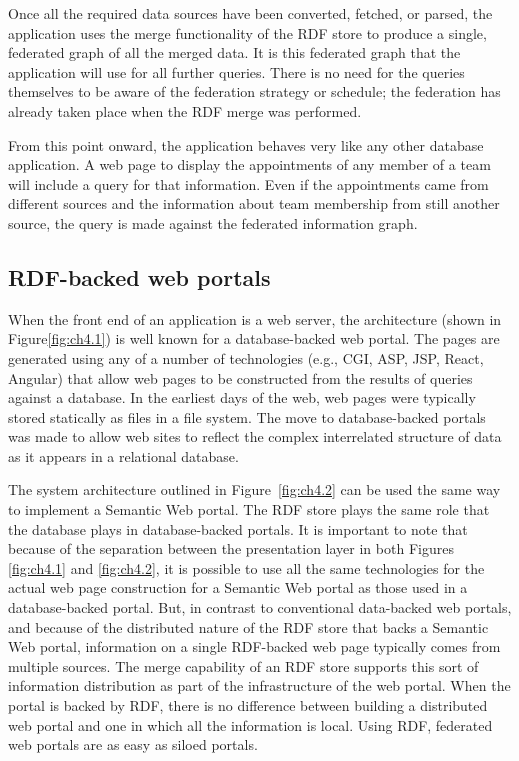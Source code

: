 Once all the required data sources have been converted, fetched, or
parsed, the application uses the merge functionality of the RDF store to
produce a single, federated graph of all the merged data. It is this
federated graph that the application will use for all further queries.
There is no need for the queries themselves to be aware of the
federation strategy or schedule; the federation has already taken place
when the RDF merge was performed.

From this point onward, the application behaves very like any other
database application. A web page to display the appointments of any
member of a team will include a query for that information. Even if the
appointments came from different sources and the information about team
membership from still another source, the query is made against the
federated information graph.

\subsection{RDF-backed web portals}

When the front end of an application is a web server, the architecture
(shown in Figure\ref{fig:ch4.1}) is well known for a database-backed web portal.
The pages are generated using any of a number of technologies (e.g.,
CGI, ASP, JSP, React, Angular) that allow web pages to be constructed
from the results of queries against a database. In the earliest days of
the web, web pages were typically stored statically as files in a file
system. The move to database-backed portals was made to allow web sites
to reflect the complex interrelated structure of data as it appears in a
relational database.

The system architecture outlined in Figure~\ref{fig:ch4.2} can be used the same way
to implement a Semantic Web portal. The RDF store plays the same role
that the database plays in database-backed portals. It is important to
note that because of the separation between the presentation layer in
both Figures \ref{fig:ch4.1} and \ref{fig:ch4.2}, it is possible to use all the same 
technologies for the actual web
page construction for a Semantic Web portal as those used in a
database-backed portal. But, in contrast to conventional data-backed web
portals, and because of the distributed nature of the RDF store that
backs a Semantic Web portal, information on a single RDF-backed web page
typically comes from multiple sources. The merge capability of an RDF
store supports this sort of information distribution as part of the
infrastructure of the web portal. When the portal is backed by RDF,
there is no difference between building a distributed web portal and one
in which all the information is local. Using RDF, federated web portals
are as easy as siloed portals.

